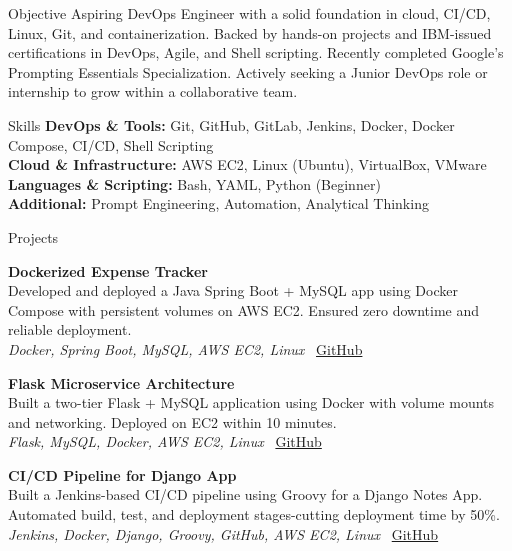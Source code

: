 \documentclass{resume}
\begin{document}
\begin{rSection}{Objective}
Aspiring DevOps Engineer with a solid foundation in cloud, CI/CD, Linux, Git, and containerization. Backed by hands-on projects and IBM-issued certifications in DevOps, Agile, and Shell scripting. Recently completed Google’s Prompting Essentials Specialization. Actively seeking a Junior DevOps role or internship to grow within a collaborative team.
\end{rSection}

\begin{rSection}{Skills}
\textbf{DevOps \& Tools:} Git, GitHub, GitLab, Jenkins, Docker, Docker Compose, CI/CD, Shell Scripting \\
\textbf{Cloud \& Infrastructure:} AWS EC2, Linux (Ubuntu), VirtualBox, VMware \\
\textbf{Languages \& Scripting:} Bash, YAML, Python (Beginner) \\
\textbf{Additional:} Prompt Engineering, Automation, Analytical Thinking
\end{rSection}


\begin{rSection}{Projects}

\item \textbf{Dockerized Expense Tracker} \\
Developed and deployed a Java Spring Boot + MySQL app using Docker Compose with persistent volumes on AWS EC2. Ensured zero downtime and reliable deployment. \\
\textit{\small Docker, Spring Boot, MySQL, AWS EC2, Linux} \hfill \faGithub~\href{https://github.com/SufiyanKhanCloud/docker-practice/tree/main/Expenses-Tracker-WebApp}{GitHub}

\item \textbf{Flask Microservice Architecture} \\
Built a two-tier Flask + MySQL application using Docker with volume mounts and networking. Deployed on EC2 within 10 minutes. \\
\textit{\small Flask, MySQL, Docker, AWS EC2, Linux} \hfill \faGithub~\href{https://github.com/SufiyanKhanCloud/docker-practice/tree/main/two-tier-flask-app}{GitHub}

\item \textbf{CI/CD Pipeline for Django App} \\
Built a Jenkins-based CI/CD pipeline using Groovy for a Django Notes App. Automated build, test, and deployment stages-cutting deployment time by 50\%. \\
\textit{\small Jenkins, Docker, Django, Groovy, GitHub, AWS EC2, Linux} \hfill \faGithub~\href{https://github.com/SufiyanKhanCloud/Django-Notes-App}{GitHub}

\end{rSection}
\end{document}
